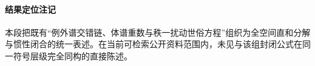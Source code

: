 \paragraph{结果定位注记}
本段把既有“例外谱交错链、体谱重数与秩一扰动世俗方程”组织为全空间直和分解与惯性闭合的统一表述。在当前可检索公开资料范围内，未见与该组封闭公式在同一符号层级完全同构的直接陈述。

\endinput
